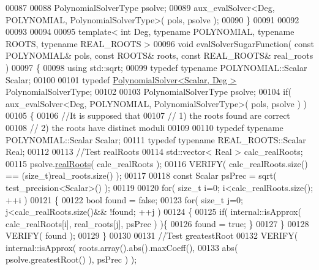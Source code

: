 \begin{DoxyCode}
00087 
00088   PolynomialSolverType psolve;
00089   aux\_evalSolver<Deg, POLYNOMIAL, PolynomialSolverType>( pols, psolve );
00090 \}
00091 
00092 
00093 
00094 
00095 \textcolor{keyword}{template}< \textcolor{keywordtype}{int} Deg, \textcolor{keyword}{typename} POLYNOMIAL, \textcolor{keyword}{typename} ROOTS, \textcolor{keyword}{typename} REAL\_ROOTS >
00096 \textcolor{keywordtype}{void} evalSolverSugarFunction( \textcolor{keyword}{const} POLYNOMIAL& pols, \textcolor{keyword}{const} ROOTS& roots, \textcolor{keyword}{const} REAL\_ROOTS& real\_roots )
00097 \{
00098   \textcolor{keyword}{using} std::sqrt;
00099   \textcolor{keyword}{typedef} \textcolor{keyword}{typename} POLYNOMIAL::Scalar Scalar;
00100 
00101   \textcolor{keyword}{typedef} \hyperlink{class_eigen_1_1_polynomial_solver}{PolynomialSolver<Scalar, Deg >}              PolynomialSolverType;
00102 
00103   PolynomialSolverType psolve;
00104   \textcolor{keywordflow}{if}( aux\_evalSolver<Deg, POLYNOMIAL, PolynomialSolverType>( pols, psolve ) )
00105   \{
00106     \textcolor{comment}{//It is supposed that}
00107     \textcolor{comment}{// 1) the roots found are correct}
00108     \textcolor{comment}{// 2) the roots have distinct moduli}
00109 
00110     \textcolor{keyword}{typedef} \textcolor{keyword}{typename} POLYNOMIAL::Scalar                 Scalar;
00111     \textcolor{keyword}{typedef} \textcolor{keyword}{typename} REAL\_ROOTS::Scalar                 Real;
00112 
00113     \textcolor{comment}{//Test realRoots}
00114     std::vector< Real > calc\_realRoots;
00115     psolve.\hyperlink{class_eigen_1_1_polynomial_solver_base_a4ea3b29499623832a0ad7b2b3ab05597}{realRoots}( calc\_realRoots );
00116     VERIFY( calc\_realRoots.size() == (size\_t)real\_roots.size() );
00117 
00118     \textcolor{keyword}{const} Scalar psPrec = sqrt( test\_precision<Scalar>() );
00119 
00120     \textcolor{keywordflow}{for}( \textcolor{keywordtype}{size\_t} i=0; i<calc\_realRoots.size(); ++i )
00121     \{
00122       \textcolor{keywordtype}{bool} found = \textcolor{keyword}{false};
00123       \textcolor{keywordflow}{for}( \textcolor{keywordtype}{size\_t} j=0; j<calc\_realRoots.size()&& !found; ++j )
00124       \{
00125         \textcolor{keywordflow}{if}( internal::isApprox( calc\_realRoots[i], real\_roots[j], psPrec ) )\{
00126           found = \textcolor{keyword}{true}; \}
00127       \}
00128       VERIFY( found );
00129     \}
00130 
00131     \textcolor{comment}{//Test greatestRoot}
00132     VERIFY( internal::isApprox( roots.array().abs().maxCoeff(),
00133           abs( psolve.greatestRoot() ), psPrec ) );

\end{DoxyCode}
